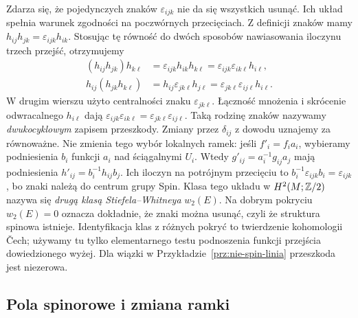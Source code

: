 \begin{uwaga}
Zdarza się, że pojedynczych znaków
$\varepsilon_{ijk}$ nie da się wszystkich
usunąć. Ich układ spełnia warunek zgodności
na poczwórnych przecięciach. Z definicji znaków mamy
$h_{ij}h_{jk}=\varepsilon_{ijk}h_{ik}$.
Stosując tę równość do dwóch sposobów nawiasowania
iloczynu trzech przejść, otrzymujemy
\[
 \begin{aligned}
 (h_{ij}h_{jk})h_{k\ell}
 &=\varepsilon_{ijk}h_{ik}h_{k\ell}
 =\varepsilon_{ijk}\varepsilon_{ik\ell}h_{i\ell},\\
 h_{ij}(h_{jk}h_{k\ell})
 &=h_{ij}\varepsilon_{jk\ell}h_{j\ell}
 =\varepsilon_{jk\ell}\varepsilon_{ij\ell}h_{i\ell}.
 \end{aligned}
\]
W drugim wierszu użyto centralności znaku $\varepsilon_{jk\ell}$.
Łączność mnożenia i skrócenie odwracalnego $h_{i\ell}$
dają $\varepsilon_{ijk}\varepsilon_{ik\ell}
=\varepsilon_{jk\ell}\varepsilon_{ij\ell}$.
Taką rodzinę znaków nazywamy
\emph{dwukocyklowym} zapisem przeszkody.
Zmiany przez $\delta_{ij}$ z dowodu
uznajemy za równoważne. Nie zmienia tego wybór lokalnych ramek:
jeśli $f'_i=f_i a_i$, wybieramy podniesienia $b_i$ funkcji $a_i$
nad ściągalnymi $U_i$. Wtedy $g'_{ij}=a_i^{-1}g_{ij}a_j$
mają podniesienia $h'_{ij}=b_i^{-1}h_{ij}b_j$.
Ich iloczyn na potrójnym przecięciu to
$b_i^{-1}\varepsilon_{ijk}b_i=\varepsilon_{ijk}$,
bo znaki należą do centrum grupy Spin.
Klasa tego układu w
$H^2(M;\mathbb{Z}/2)$ nazywa się
\emph{drugą klasą Stiefela--Whitneya}
$w_2(E)$. Na dobrym pokryciu
$w_2(E)=0$ oznacza dokładnie, że znaki
można usunąć, czyli że struktura spinowa
istnieje. Identyfikacja klas z różnych
pokryć to twierdzenie kohomologii Čech;
używamy tu tylko elementarnego testu
podnoszenia funkcji przejścia dowiedzionego
wyżej. Dla wiązki w
Przykładzie~\ref{prz:nie-spin-linia}
przeszkoda jest niezerowa.
\end{uwaga}

\subsection{Pola spinorowe i zmiana ramki}
\label{sec:pola-spinorowe-podstawy}

